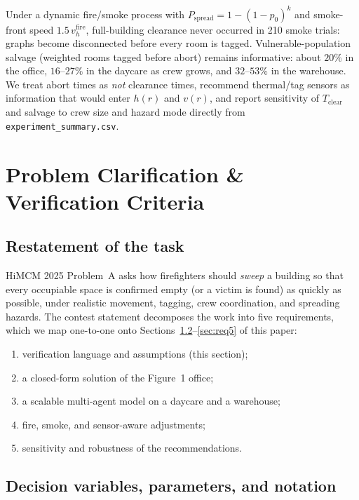 \documentclass[12pt]{article}
\newcommand{\Tclear}{T_{\mathrm{clear}}}
\newcommand{\whall}{v_{h}}
\begin{document}
Under a dynamic fire/smoke process with
\(P_{\mathrm{spread}}=1-(1-p_0)^{k}\) and smoke-front speed \(1.5\,\whall^{\mathrm{fire}}\),
full-building clearance never occurred in 210 smoke trials: graphs become disconnected
before every room is tagged. Vulnerable-population salvage (weighted rooms tagged before
abort) remains informative: about \(20\%\) in the office, \(16\)--\(27\%\) in the daycare
as crew grows, and \(32\)--\(53\%\) in the warehouse. We treat abort times as
\emph{not} clearance times, recommend thermal/tag sensors as information that would
enter \(h(r)\) and \(v(r)\), and report sensitivity of \(\Tclear\) and salvage to crew
size and hazard mode directly from \texttt{experiment\_summary.csv}.

\tableofcontents
\newpage

\section{Problem Clarification \& Verification Criteria}

\subsection{Restatement of the task}

HiMCM 2025 Problem~A asks how firefighters should \emph{sweep} a building so that every
occupiable space is confirmed empty (or a victim is found) as quickly as possible, under
realistic movement, tagging, crew coordination, and spreading hazards. The contest
statement decomposes the work into five requirements, which we map one-to-one onto
Sections~\ref{sec:req1}--\ref{sec:req5} of this paper:
\begin{enumerate}[leftmargin=1.6em,itemsep=0.25em]
  \item verification language and assumptions (this section);
  \item a closed-form solution of the Figure~1 office;
  \item a scalable multi-agent model on a daycare and a warehouse;
  \item fire, smoke, and sensor-aware adjustments;
  \item sensitivity and robustness of the recommendations.
\end{enumerate}

\subsection{Decision variables, parameters, and notation}
\label{sec:req1}
\end{document}
